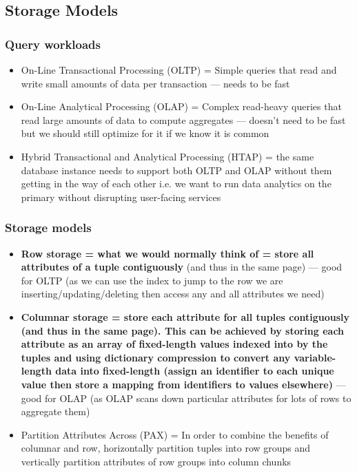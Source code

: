 \documentclass[20pt,a4paper,landscape]{extarticle}
\begin{document}
\begin{flushleft}
\subsection{Storage Models}
\subsubsection{Query workloads}
\begin{itemize}
\item On-Line Transactional Processing (OLTP) = Simple queries that read and write small amounts of data per transaction --- needs to be fast
\item On-Line Analytical Processing (OLAP) = Complex read-heavy queries that read large amounts of data to compute aggregates --- doesn’t need to be fast but we should still optimize for it if we know it is common
\item Hybrid Transactional and Analytical Processing (HTAP) = the same database instance needs to support both OLTP and OLAP without them getting in the way of each other i.e. we want to run data analytics on the primary without disrupting user-facing services
\end{itemize}
\subsubsection{Storage models}
\begin{itemize}
\item \textbf{Row storage = what we would normally think of = store all attributes of a tuple contiguously} (and thus in the same page) --- good for OLTP (as we can use the index to jump to the row we are inserting/updating/deleting then access any and all attributes we need)
\item \textbf{Columnar storage = store each attribute for all tuples contiguously (and thus in the same page). This can be achieved by storing each attribute as an array of fixed-length values indexed into by the tuples and using dictionary compression to convert any variable-length data into fixed-length (assign an identifier to each unique value then store a mapping from identifiers to values elsewhere)} --- good for OLAP (as OLAP scans down particular attributes for lots of rows to aggregate them)
\item Partition Attributes Across (PAX) = In order to combine the benefits of columnar and row, horizontally partition tuples into row groups and vertically partition attributes of row groups into column chunks
\end{itemize}

\end{flushleft}
\end{document}
